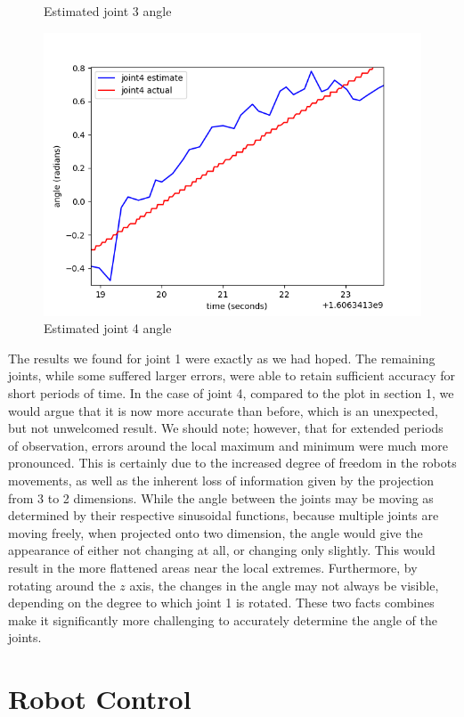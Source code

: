 \documentclass[11pt]{article}
\begin{document}
\begin{figure}[!htb]
    \caption{Estimated joint 3 angle}
\endminipage\hfill
{}
    \includegraphics[width=\linewidth]{../figures/04_joint4.png}
    \caption{Estimated joint 4 angle}
\endminipage\hfill
\end{figure}

The results we found for joint 1 were exactly as we had hoped. 
The remaining joints, while some suffered larger errors, were able to retain sufficient accuracy for short periods of time. 
In the case of joint 4, compared to the plot in section 1, we would argue that it is now more accurate than before, which is an unexpected, but not unwelcomed result. 
We should note; however, that for extended periods of observation, errors around the local maximum and minimum were much more pronounced.
This is certainly due to the increased degree of freedom in the robots movements, as well as the inherent loss of information given by the projection from 3 to 2 dimensions. 
While the angle between the joints may be moving as determined by their respective sinusoidal functions, because multiple joints are moving freely, when projected onto two dimension, the angle would give the appearance of either not changing at all, or changing only slightly. 
This would result in the more flattened areas near the local extremes. 
Furthermore, by rotating around the $z$ axis, the changes in the angle may not always be visible, depending on the degree to which joint 1 is rotated. 
These two facts combines make it significantly more challenging to accurately determine the angle of the joints.

\section{Robot Control}
\end{document}
